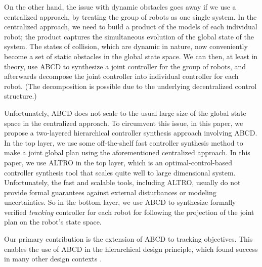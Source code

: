 On the other hand, the issue with dynamic obstacles goes away if we use a centralized approach, by treating the group of robots as one single system.
In the centralized approach, we need to build a product of the models of each individual robot; the product captures the simultaneous evolution of the global state of the system.
The states of collision, which are dynamic in nature, now conveniently become a set of static obstacles in the global state space.
We can then, at least in theory, use ABCD to synthesize a joint controller for the group of robots, and afterwards decompose the joint controller into individual controller for each robot.
(The decomposition is possible due to the underlying decentralized control structure.)

Unfortunately, ABCD does not scale to the usual large size of the global state space in the centralized approach.
To circumvent this issue, in this paper, we propose a two-layered hierarchical controller synthesis approach involving ABCD.
In the top layer, we use some off-the-shelf fast controller synthesis method to make a joint global plan using the aforementioned centralized approach.
In this paper, we use ALTRO \cite{altro} in the top layer, which is an optimal-control-based controller synthesis tool that scales quite well to large dimensional system.
Unfortunately, the fast and scalable tools, including ALTRO, usually do not provide formal guarantees against external disturbances or modeling uncertainties.
So in the bottom layer, we use ABCD to synthesize formally verified \emph{tracking} controller for each robot for following the projection of the joint plan on the robot's state space.

Our primary contribution is the extension of ABCD to tracking objectives.
This enables the use of ABCD in the hierarchical design principle, which found success in many other design contexts \cite{murray,schmidt hierarchical DES, sayan mitra}.

